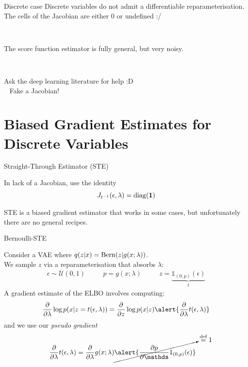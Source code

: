 \begin{frame}{Discrete case}
	Discrete variables do not admit a differentiable reparameterisation. The cells of the Jacobian are either $0$ or undefined :/
	
	~ \pause
	
	The score function estimator is fully general, but very noisy.
	
	~ \pause
	
	Ask the deep learning literature for help :D \\ \pause
	~ \alert{Fake a Jacobian!}
\end{frame}

\section{Biased Gradient Estimates for Discrete Variables}


\begin{frame}{Straight-Through Estimator (STE)}

	In lack of a Jacobian, use the identity
	\begin{equation*}
		J_{{t}^{-1}}(\epsilon, \lambda) = \operatorname{diag}(\mathbf 1)
	\end{equation*}
	
	
	STE is a biased gradient estimator that works in some cases, but unfortunately there are no general recipes.
	
\end{frame}

\begin{frame}{Bernoulli-STE}

	Consider a VAE where $q(z|x) = \operatorname{Bern}(z|g(x; \lambda))$. \pause \\
	We sample $z$ via a reparameterisation that absorbs $\lambda$:
	\begin{equation*}
		\begin{aligned}
			\epsilon \sim \mathcal U(0, 1) & \quad & p = g(x; \lambda) & \quad & z= \underbrace{\mathds 1_{(0, p)}(\epsilon)}_{t} 
		\end{aligned}
	\end{equation*}
	\pause
	A gradient estimate of the ELBO involves computing:
	\begin{equation*}
		\pdv{\lambda} \log p(x|z=t(\epsilon, \lambda)) = \pdv{z} \log p(x|z) \alert{\pdv{\lambda} t(\epsilon, \lambda)}
	\end{equation*}	
	\pause
	and we use our \emph{pseudo gradient}
	\vspace{-10pt}
	\begin{equation*}
		\begin{aligned}			
			\pdv{\lambda} t(\epsilon, \lambda) &=  \pdv{\lambda} g(x; \lambda)\cancelto{\overset{\text{def}}{=}1}{\alert{ \pdv{p} \mathds 1_{(0, p)}(\epsilon)}} 
		\end{aligned}
	\end{equation*}
	

\end{frame}


